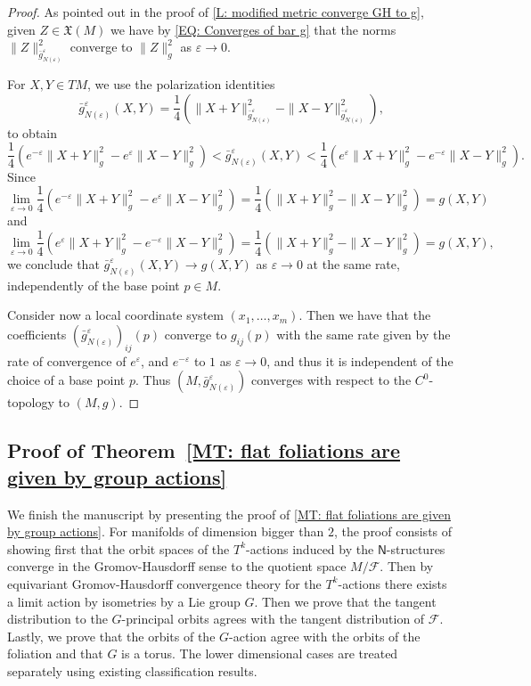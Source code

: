 \documentclass[12pt,a4paper,reqno]{amsart}
\theoremstyle{definition}
\numberwithin{equation}{section}
\newcommand{\fol}{\mathcal{F}}
\newcommand{\Ns}{\mathsf{N}}
\newcommand{\X}{\mathfrak{X}}
\begin{document}
\begin{proof}
As pointed out in the proof of \th\ref{L: modified metric converge GH to g}, given $Z\in \X(M)$ we have by \eqref{EQ: Converges of bar g} that the norms $\|Z\|^2_{\bar{g}^\varepsilon_{N(\varepsilon)}}$ converge to $\|Z\|^2_g$ as $\varepsilon\to 0$.

For $X,Y\in TM$, we use the polarization identities 
\[
\bar{g}^\varepsilon_{N(\varepsilon)}(X,Y) = \frac{1}{4}\left(\|X+Y\|^2_{\bar{g}^\varepsilon_{N(\varepsilon)}}-\|X-Y\|^2_{\bar{g}^\varepsilon_{N(\varepsilon)}}\right),
\]
to obtain
\[
\frac{1}{4}\left(e^{-\varepsilon}\|X+Y\|^2_{g}-e^\varepsilon\|X-Y\|^2_{g}\right)<\bar{g}^\varepsilon_{N(\varepsilon)}(X,Y)<\frac{1}{4}\left(e^{\varepsilon}\|X+Y\|^2_{g}-e^{-\varepsilon}\|X-Y\|^2_{g}\right).
\]
Since 
\[\lim_{\varepsilon\to 0}\frac{1}{4}\left(e^{-\varepsilon}\|X+Y\|^2_{g}-e^\varepsilon\|X-Y\|^2_{g}\right) = \frac{1}{4}\left(\|X+Y\|^2_{g}-\|X-Y\|^2_{g}\right) = g(X,Y)
\]
and 
\[\lim_{\varepsilon\to 0}\frac{1}{4}\left(e^{\varepsilon}\|X+Y\|^2_{g}-e^{-\varepsilon}\|X-Y\|^2_{g}\right) = \frac{1}{4}\left(\|X+Y\|^2_{g}-\|X-Y\|^2_{g}\right) = g(X,Y),
\]
we conclude that $\bar{g}^\varepsilon_{N(\varepsilon)}(X,Y)\to g(X,Y)$ as $\varepsilon\to 0$  at the same rate, independently of the base point $p\in M$.

Consider now a local coordinate system $(x_1,\ldots,x_m)$. Then we have that the coefficients $(\bar{g}^\varepsilon_{N(\varepsilon)})_{ij}(p)$ converge to $g_{ij}(p)$ with the same rate given by the rate of convergence of $e^\varepsilon$, and $e^{-\varepsilon}$ to $1$ as $\varepsilon\to 0$, and thus it is independent of the choice of a base point $p$.  Thus $(M,\bar{g}^\varepsilon_{N(\varepsilon)})$ converges with respect to the $C^0$-topology to $(M,g)$.
\end{proof}

\subsection{Proof of Theorem~\ref{MT: flat foliations are given by group actions}}\label{SS: Proof that B-foliations on simply-connected are given by torus actions}

We finish the manuscript by presenting the proof of \th\ref{MT: flat foliations are given by group actions}. For manifolds of dimension bigger than $2$, the proof consists of showing first that the orbit spaces of the $T^k$-actions induced by the $\Ns$-structures converge in the Gromov-Hausdorff sense to the quotient space $M/\fol$. Then by equivariant Gromov-Hausdorff convergence theory for the $T^k$-actions there exists a limit action by isometries by a Lie group $G$. Then we prove that the tangent distribution to the $G$-principal orbits agrees with the tangent distribution of $\fol$. Lastly, we prove that the orbits of the $G$-action agree with the orbits of the foliation and that $G$ is a torus. The lower dimensional cases are treated separately using existing classification results.
\end{document}
